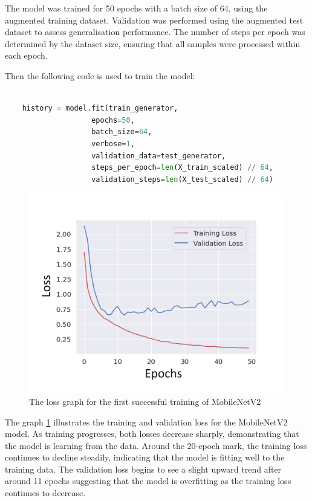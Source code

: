 The model was trained for 50 epochs with a batch size of 64, using the augmented training dataset. Validation was performed using the augmented test dataset to assess generalisation performance. The number of steps per epoch was determined by the dataset size, ensuring that all samples were processed within each epoch.

Then the following code is used to train the model:

\begin{lstlisting}[language=Python, basicstyle=\ttfamily\footnotesize]

    history = model.fit(train_generator,
                    epochs=50,
                    batch_size=64,
                    verbose=1,
                    validation_data=test_generator,
                    steps_per_epoch=len(X_train_scaled) // 64,
                    validation_steps=len(X_test_scaled) // 64)

\end{lstlisting}


\begin{figure}[H]
    \centering{}
    \includegraphics[scale=0.5]{fed_images/train_loss_MobileNetv2_captioned.png}
    \caption{The loss graph for the first successful training of MobileNetV2}
    \label{figure:loss_mnv2}
\end{figure}

The graph \ref{figure:loss_mnv2} illustrates the training and validation loss for the MobileNetV2 model. As training progresses, both losses decrease sharply, demonstrating that the model is learning from the data. Around the 20-epoch mark, the training loss continues to decline steadily, indicating that the model is fitting well to the training data. The validation loss begins to see a slight upward trend after around 11 epochs suggesting that the model is overfitting as the training loss continues to decrease.

